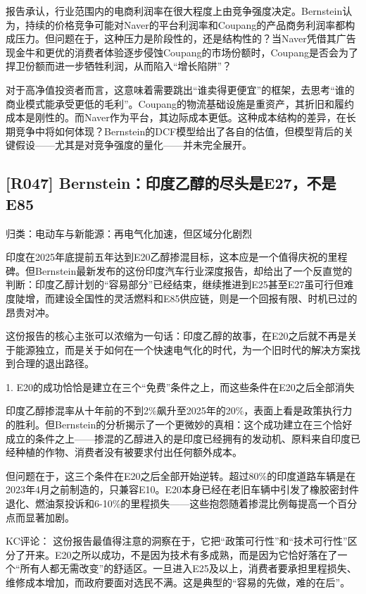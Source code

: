 \documentclass[11pt]{ctexart}
\begin{document}
报告承认，行业范围内的电商利润率在很大程度上由竞争强度决定。Bernstein认为，持续的价格竞争可能对Naver的平台利润率和Coupang的产品商务利润率都构成压力。但问题在于，这种压力是阶段性的，还是结构性的？当Naver凭借其广告现金牛和更优的消费者体验逐步侵蚀Coupang的市场份额时，Coupang是否会为了捍卫份额而进一步牺牲利润，从而陷入“增长陷阱”？

对于高净值投资者而言，这意味着需要跳出“谁卖得更便宜”的框架，去思考“谁的商业模式能承受更低的毛利”。Coupang的物流基础设施是重资产，其折旧和履约成本是刚性的。而Naver作为平台，其边际成本更低。这种成本结构的差异，在长期竞争中将如何体现？Bernstein的DCF模型给出了各自的估值，但模型背后的关键假设——尤其是对竞争强度的量化——并未完全展开。

\subsection{[R047] Bernstein：印度乙醇的尽头是E27，不是E85}
{\small\color{refgray}归类：电动车与新能源：再电气化加速，但区域分化剧烈}

印度在2025年底提前五年达到E20乙醇掺混目标，这本应是一个值得庆祝的里程碑。但Bernstein最新发布的这份印度汽车行业深度报告，却给出了一个反直觉的判断：印度乙醇计划的“容易部分”已经结束，继续推进到E25甚至E27虽可行但难度陡增，而建设全国性的灵活燃料和E85供应链，则是一个回报有限、时机已过的昂贵对冲。

这份报告的核心主张可以浓缩为一句话：印度乙醇的故事，在E20之后就不再是关于能源独立，而是关于如何在一个快速电气化的时代，为一个旧时代的解决方案找到合理的退出路径。

1. E20的成功恰恰是建立在三个“免费”条件之上，而这些条件在E20之后全部消失

印度乙醇掺混率从十年前的不到2\%飙升至2025年的20\%，表面上看是政策执行力的胜利。但Bernstein的分析揭示了一个更微妙的真相：这个成功建立在三个恰好成立的条件之上——掺混的乙醇进入的是印度已经拥有的发动机、原料来自印度已经种植的作物、消费者没有被要求付出任何额外成本。

但问题在于，这三个条件在E20之后全部开始逆转。超过80\%的印度道路车辆是在2023年4月之前制造的，只兼容E10。E20本身已经在老旧车辆中引发了橡胶密封件退化、燃油泵投诉和6-10\%的里程损失——这些抱怨随着掺混比例每提高一个百分点而显著加剧。

KC评论： 这份报告最值得注意的洞察在于，它把“政策可行性”和“技术可行性”区分了开来。E20之所以成功，不是因为技术有多成熟，而是因为它恰好落在了一个“所有人都无需改变”的舒适区。一旦进入E25及以上，消费者要承担里程损失、维修成本增加，而政府要面对选民不满。这是典型的“容易的先做，难的在后”。
\end{document}
